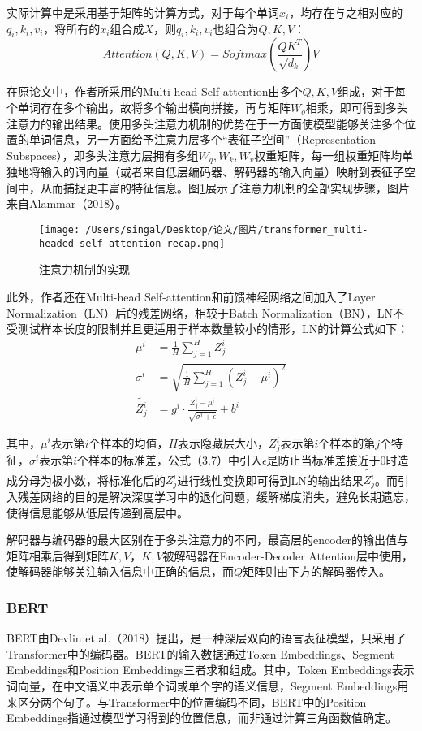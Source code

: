 \documentclass[lang=cn]{elegantpaper}
\begin{document}
实际计算中是采用基于矩阵的计算方式，对于每个单词$x_i$，均存在与之相对应的$q_i,k_i,v_i$，将所有的$x_i$组合成$X$，则$q_i,k_i,v_i$也组合为$Q,K,V$：
\begin{equation}
    Attention(Q,K,V)=Softmax\left(\frac{QK^T}{\sqrt {d_k}}\right)V
\end{equation}

在原论文中，作者所采用的Multi-head Self-attention由多个$Q,K,V$组成，对于每个单词存在多个输出，故将多个输出横向拼接，再与矩阵$W_o$相乘，即可得到多头注意力的输出结果。使用多头注意力机制的优势在于一方面使模型能够关注多个位置的单词信息，另一方面给予注意力层多个“表征子空间”（Representation Subspaces），即多头注意力层拥有多组$W_q,W_k,W_v$权重矩阵，每一组权重矩阵均单独地将输入的词向量（或者来自低层编码器、解码器的输入向量）映射到表征子空间中，从而捕捉更丰富的特征信息。图\ref{图2}展示了注意力机制的全部实现步骤，图片来自Alammar（2018）\cite{25}。

\begin{figure}[htb]
    \centering
    \texttt{[image: /Users/singal/Desktop/论文/图片/transformer\_multi-headed\_self-attention-recap.png]}
    \caption{注意力机制的实现}
    \label{图2}
\end{figure}

此外，作者还在Multi-head Self-attention和前馈神经网络之间加入了Layer Normalization（LN）后的残差网络，相较于Batch Normalization（BN），LN不受测试样本长度的限制并且更适用于样本数量较小的情形，LN的计算公式如下：
\begin{align}
    \mu^i&=\frac{1}{H}\sum_{j=1}^{H}Z_j^i\\
    \sigma^i&=\sqrt{\frac{1}{H}\sum_{j=1}^{H}(Z_j^i-\mu^i)^2}\\
    \widetilde{Z_j^i}&=g^i\cdot \frac{Z_j^i-\mu^i}{\sqrt{\sigma^i+\epsilon}}+b^i
\end{align}

其中，$\mu^i$表示第$i$个样本的均值，$H$表示隐藏层大小，$Z_j^i$表示第$i$个样本的第$j$个特征，$\sigma^i$表示第$i$个样本的标准差，公式（3.7）中引入$\epsilon$是防止当标准差接近于0时造成分母为极小数，将标准化后的$Z_j^i$进行线性变换即可得到LN的输出结果$\widetilde{Z_j^i}$。而引入残差网络的目的是解决深度学习中的退化问题，缓解梯度消失，避免长期遗忘，使得信息能够从低层传递到高层中。

解码器与编码器的最大区别在于多头注意力的不同，最高层的encoder的输出值与矩阵相乘后得到矩阵$K,V$，$K,V$被解码器在Encoder-Decoder Attention层中使用，使解码器能够关注输入信息中正确的信息，而$Q$矩阵则由下方的解码器传入。

\subsubsection{BERT}
BERT由Devlin et al.（2018）\cite{26}提出，是一种深层双向的语言表征模型，只采用了Transformer中的编码器。BERT的输入数据通过Token Embeddings、Segment Embeddings和Position Embeddings三者求和组成。其中，Token Embeddings表示词向量，在中文语义中表示单个词或单个字的语义信息，Segment Embeddings用来区分两个句子。与Transformer中的位置编码不同，BERT中的Position Embeddings指通过模型学习得到的位置信息，而非通过计算三角函数值确定。
\end{document}

